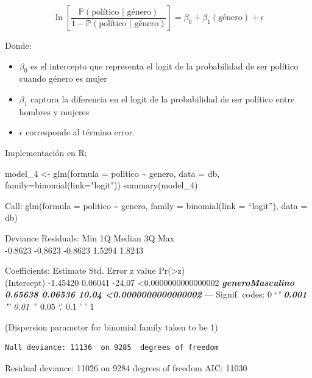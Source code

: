 \documentclass[
  12pt,
  a4paper,
]{article}
\newenvironment{Shaded}{\begin{snugshade}}{\end{snugshade}}
\newcommand{\AttributeTok}[1]{\textcolor[rgb]{0.77,0.63,0.00}{#1}}
\newcommand{\FunctionTok}[1]{\textcolor[rgb]{0.00,0.00,0.00}{#1}}
\newcommand{\NormalTok}[1]{#1}
\newcommand{\OtherTok}[1]{\textcolor[rgb]{0.56,0.35,0.01}{#1}}
\newcommand{\SpecialCharTok}[1]{\textcolor[rgb]{0.00,0.00,0.00}{#1}}
\newcommand{\StringTok}[1]{\textcolor[rgb]{0.31,0.60,0.02}{#1}}
\providecommand{\tightlist}{%
  \setlength{\itemsep}{0pt}\setlength{\parskip}{0pt}}
\begin{document}
\[
\ln\left[ \frac {\mathbb{P}(\text{político | género}  ) }{ 1 - \mathbb{P}( \text{político | género} ) } \right] = \beta_{0} + \beta_{1}(\text{género}) + \epsilon
\]

Donde:

\begin{itemize}
\tightlist
\item
  \(\beta_{0}\) es el intercepto que representa el logit de la probabilidad de ser político cuando género es mujer
\item
  \(\beta_{1}\) captura la diferencia en el logit de la probabilidad de ser político entre hombres y mujeres
\item
  \(\epsilon\) corresponde al término error.
\end{itemize}

Implementación en R:

\begin{Shaded}
\begin{Highlighting}[]
\NormalTok{model\_4 }\OtherTok{\textless{}{-}} \FunctionTok{glm}\NormalTok{(}\AttributeTok{formula =}\NormalTok{ politico }\SpecialCharTok{\textasciitilde{}}\NormalTok{ genero, }
               \AttributeTok{data =}\NormalTok{ db, }\AttributeTok{family=}\FunctionTok{binomial}\NormalTok{(}\AttributeTok{link=}\StringTok{"logit"}\NormalTok{))}
\FunctionTok{summary}\NormalTok{(model\_4)}
\end{Highlighting}
\end{Shaded}

Call:
glm(formula = politico \textasciitilde{} genero, family = binomial(link = ``logit''),
data = db)

Deviance Residuals:
Min 1Q Median 3Q Max\\
-0.8623 -0.8623 -0.8623 1.5294 1.8243

Coefficients:
Estimate Std. Error z value Pr(\textgreater\textbar z\textbar)\\
(Intercept) -1.45420 0.06041 -24.07 \textless0.0000000000000002 \textbf{\emph{
generoMasculino 0.65638 0.06536 10.04 \textless0.0000000000000002 }}
---
Signif. codes: 0 `\emph{\textbf{' 0.001 '}' 0.01 '}' 0.05 `.' 0.1 ' ' 1

(Dispersion parameter for binomial family taken to be 1)

\begin{verbatim}
Null deviance: 11136  on 9285  degrees of freedom
\end{verbatim}

Residual deviance: 11026 on 9284 degrees of freedom
AIC: 11030
\end{document}
